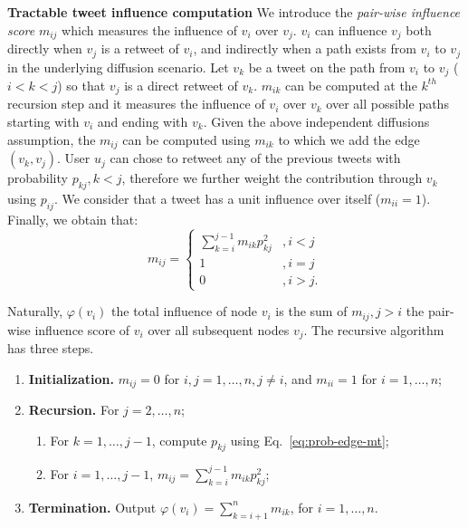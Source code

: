\textbf{Tractable tweet influence computation}
We introduce the \emph{pair-wise influence score} $m_{ij}$ which measures the influence of $v_i$ over $v_j$.
$v_i$ can influence $v_j$ both directly when $v_j$ is a retweet of $v_i$, and indirectly when a path exists from $v_i$ to $v_j$ in the underlying diffusion scenario.
Let $v_k$ be a tweet on the path from $v_i$ to $v_j$ ($i < k < j$) so that $v_j$ is a direct retweet of $v_k$.
$m_{ik}$ can be computed at the $k^{th}$ recursion step and it measures the influence of $v_i$ over $v_k$ over all possible paths starting with $v_i$ and ending with $v_k$.
Given the above independent diffusions assumption, the $m_{ij}$ can be computed using $m_{ik}$ to which we add the edge $(v_k, v_j)$.
User $u_j$ can chose to retweet any of the previous tweets with probability $p_{kj}, k < j$, therefore we further weight the contribution through $v_k$ using $p_{ij}$.
We consider that a tweet has a unit influence over itself ($m_{ii} = 1$).
Finally, we obtain that:
\begin{equation} \label{eq:Mij-mt}
m_{ij} =
\left\{
\begin{array}{ll}
	\sum^{j-1}_{k=i} m_{ik}p_{kj}^2 &,i < j \\
	1 & ,i = j \\
	0 & ,i > j.
\end{array}
\right.
\end{equation}

Naturally, $\varphi(v_i)$ the total influence of node $v_i$ is the sum of $m_{ij}, j > i$ the pair-wise influence score of $v_i$ over all subsequent nodes $v_j$. 
The recursive algorithm has three steps. 
\begin{enumerate}
	\item {\bf Initialization.} $m_{ij}=0$ for $i, j=1,\ldots,n, j \neq i$, and $m_{ii} = 1$ for $i=1,\ldots,n$;
	\item {\bf Recursion.} For $j=2, \ldots, n$;
	\begin{enumerate}
		\item For $k=1, \ldots, j-1$, compute $p_{kj}$ using Eq.~\eqref{eq:prob-edge-mt};
		\item For $i=1, \ldots, j-1$, $m_{ij} = \sum_{k=i}^{j-1} m_{ik}p_{kj}^2$;
	\end{enumerate}
	\item {\bf Termination.} Output $\varphi(v_i)= \sum_{k=i+1}^n m_{ik}$, for $i=1,\ldots,n$. 
\end{enumerate}

